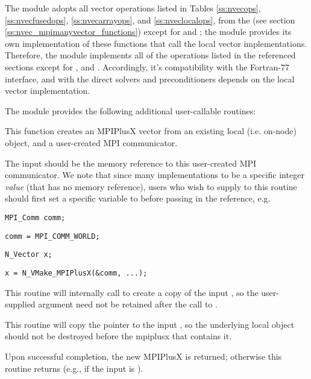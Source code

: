 The {\nvecmpiplusx} module adopts all vector operations listed
in Tables \ref{ss:nvecops}, \ref{ss:nvecfusedops}, \ref{ss:nvecarrayops},
and \ref{ss:nveclocalops}, from the {\nvecmpimanyvector} (see section
\ref{ss:nvec_mpimanyvector_functions}) except for 
and ; the module provides its own implementation
of these functions that call the local vector implementations. Therefore,
the {\nvecmpiplusx} module implements all of the operations listed in the
referenced sections except for , and
. Accordingly, it's compatibility
with the {\sundials} Fortran-77 interface, and with the {\sundials}
direct solvers and preconditioners depends on the local vector implementation.

The module {\nvecmpiplusx} provides the following additional
user-callable routines:
{
  This function creates an MPIPlusX vector from an existing local
  (i.e. on-node) {\nvector} object, and a user-created MPI communicator.

  The input  should be the memory reference to this
  user-created MPI communicator.  We note that since many {\mpi}
  implementations   to be a specific
  integer \emph{value} (that has no memory reference), users who wish
  to supply  to this routine should first
  set a specific  variable to 
  before passing in the reference, e.g.

  \hspace{0.5in} \texttt{MPI\_Comm comm;}\vspace{-0.5em}
  
  \hspace{0.5in} \texttt{comm = MPI\_COMM\_WORLD;}\vspace{-0.5em}
  
  \hspace{0.5in} \texttt{N\_Vector x;}\vspace{-0.5em}
  
  \hspace{0.5in} \texttt{x = N\_VMake\_MPIPlusX(\&comm, ...);}

  This routine will internally call  to create a
  copy of the input , so the user-supplied  argument
  need not be retained after the call to .

  This routine will copy the  pointer to the input
  , so the underlying local {\nvector} object
  should not be destroyed before the mpiplusx that contains it.

  Upon successful completion, the new MPIPlusX is returned;
  otherwise this routine returns  (e.g., if the input
   is ).
}

